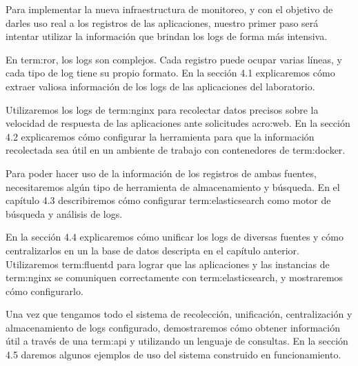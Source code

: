 Para implementar la nueva infraestructura de monitoreo, y con el objetivo de
darles uso real a los registros de las aplicaciones, nuestro primer paso será
intentar utilizar la información que brindan los logs de forma más intensiva.

En \gls{term:ror}, los logs son complejos. Cada registro puede ocupar varias
líneas, y cada tipo de log tiene su propio formato. En la sección 4.1
explicaremos cómo extraer valiosa información de los logs de las aplicaciones
del laboratorio.

Utilizaremos los logs de \gls{term:nginx} para recolectar datos precisos sobre
la velocidad de respuesta de las aplicaciones ante solicitudes \gls{acro:web}.
En la sección 4.2 explicaremos cómo configurar la herramienta para que la
información recolectada sea útil en un ambiente de trabajo con contenedores de
\gls{term:docker}.

Para poder hacer uso de la información de los registros de ambas fuentes,
necesitaremos algún tipo de herramienta de almacenamiento y búsqueda. En el
capítulo 4.3 describiremos cómo configurar \gls{term:elasticsearch} como motor
de búsqueda y análisis de logs.

En la sección 4.4 explicaremos cómo unificar los logs de diversas fuentes y
cómo centralizarlos en un la base de datos descripta en el capítulo anterior.
Utilizaremos \gls{term:fluentd} para lograr que las aplicaciones y las
instancias de \gls{term:nginx} se comuniquen correctamente con
\gls{term:elasticsearch}, y mostraremos cómo configurarlo.

Una vez que tengamos todo el sistema de recolección, unificación,
centralización y almacenamiento de logs configurado, demostraremos cómo obtener
información útil a través de una \gls{term:api} y utilizando un lenguaje de
consultas. En la sección 4.5 daremos algunos ejemplos de uso del sistema
construido en funcionamiento.
